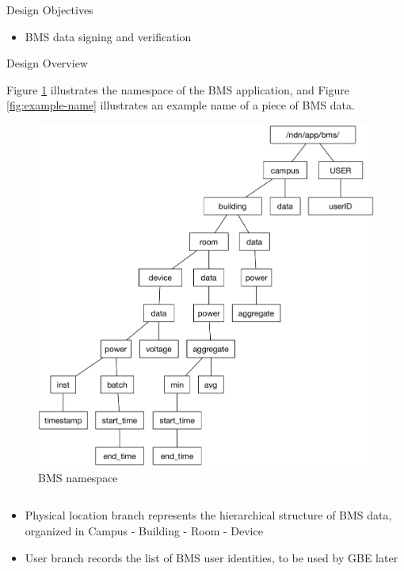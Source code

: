 \documentclass[final,hyperref={pdfpagelabels=false},20pt]{beamer}
\begin{document}
\begin{frame}[t]
\begin{columns}[t]
\begin{column}{.465\textwidth}
\begin{block}{Design Objectives}

\begin{itemize}
\item{BMS data signing and verification}
\end{itemize}

\end{block}


\begin{block}{Design Overview}

Figure \ref{fig:namespace} illustrates the namespace of the BMS application, and Figure \ref{fig:example-name} illustrates an example name of a piece of BMS data.

\begin{figure}
\includegraphics[width=0.8\linewidth]{bms-namespace-update-Sep19}
\caption{BMS namespace}
\label{fig:namespace}
\end{figure}


\begin{columns}[T]

\begin{column}{.45\textwidth}
\begin{itemize}
\item{Physical location branch represents the hierarchical structure of BMS data, organized in Campus - Building - Room - Device}
\item{User branch records the list of BMS user identities, to be used by GBE later}
\end{itemize}
\end{column}


\end{columns}
\end{block}
\end{column}
\end{columns}
\end{frame}
\end{document}
